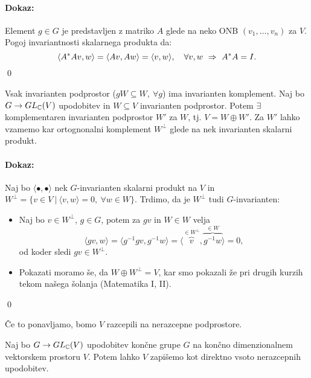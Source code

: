 \paragraph{Dokaz:}
Element $g \in G$ je predstavljen z matriko $A$ glede na neko ONB $(v_1, \ldots, v_n)$ za $V$. Pogoj invariantnosti skalarnega produkta
da:
\[
	\langle A^* A v, w\rangle = \langle Av, Aw\rangle = \langle v, w\rangle, \quad \forall v,w \ \Rightarrow \ A^* A = I.
\]
\qed

\begin{trditev}
	Vsak invarianten podprostor ($gW \subseteq W,\ \forall g$) ima invarianten komplement. Naj bo $G \to GL_{\mathbb{C}}(V)$ upodobitev
	in $W \subseteq V$ invarianten podprostor. Potem $\exists$ komplementaren invarianten podprostor $W'$ za $W$, tj. $V = W \oplus W'$.
	Za $W'$ lahko vzamemo kar ortognonalni komplement $W^{\perp}$ glede na nek invarianten skalarni produkt.
\end{trditev}

\paragraph{Dokaz:}
Naj bo $\langle \bullet, \bullet \rangle$ nek $G$-invarianten skalarni produkt na $V$ in $W^\perp = \big\{v \in V\ |\ \langle v,w\rangle = 0,\ \forall w \in W\big\}$.
Trdimo, da je $W^\perp$ tudi $G$-invarianten:
\begin{itemize}
	\item{Naj bo $v \in W^\perp$, $g \in G$, potem za $gv$ in $W \in W$ velja 
	\[
		\langle gv, w \rangle = \langle g^{-1}gv, g^{-1}w\rangle = \langle \overbrace{v}^{\in W^\perp}, \overbrace{g^{-1}w}^{\in W} \rangle = 0,
	\] od koder sledi $gv \in W^\perp$.}
	\item{Pokazati moramo \v se, da $W \oplus W^\perp = V$, kar smo pokazali \v ze pri drugih kurzih tekom na\v sega \v solanja (Matematika I, II).}
\end{itemize}
\qed

\begin{posledica}
	[{\em Komentar}] \v Ce to ponavljamo, bomo $V$ razcepili na nerazcepne podprostore.
\end{posledica}

\begin{trditev}
	Naj bo $G \to GL_{\mathbb{C}}(V)$ upodobitev kon\v cne grupe $G$ na kon\v cno dimenzionalnem vektorskem prostoru $V$. Potem lahko $V$ zapi\v semo kot
	direktno vsoto nerazcepnih upodobitev.
\end{trditev}

